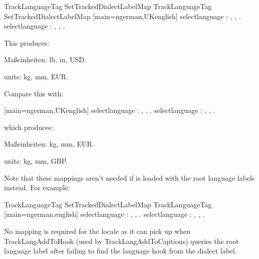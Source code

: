 \documentclass[titlepage=false,oneside,
 fontsize=12pt,captions=tableheading]{scrbook}
\newcommand{\tklcaptions}[1]{\glslink{captionsdialect}{\csfmt{captions#1}}}
\begin{document}
\begin{codebox}[fontupper=\small\ttfamily]
\codepar
{}
\codepar
\gls{TrackLanguageTag}
\gls{SetTrackedDialectLabelMap}
\codepar
\gls{TrackLanguageTag}
\gls{SetTrackedDialectLabelMap}
\codepar
{}[main=ngerman,UKenglish]
\codepar
{}
\gls{selectlanguage}
\codepar
{}: , , .
\codepar
\gls{selectlanguage}
\codepar
{}: , , .
\codepar
{}
\end{codebox}
This produces:
\begin{resultbox}
Ma\ss einheiten: lb, in, USD.

units: kg, mm, EUR.
\end{resultbox}
Compare this with:
\begin{codebox}
\codepar
{}[main=ngerman,UKenglish]
\codepar
{}
\gls{selectlanguage}
\codepar
{}: , , .
\codepar
\gls{selectlanguage}
\codepar
{}: , , .
\codepar
{}
\end{codebox}
which produces:
\begin{resultbox}
Ma\ss einheiten: kg, mm, EUR.

units: kg, mm, GBP.
\end{resultbox}

Note that these mappings aren't needed if 
is loaded with the root language labels instead. For example:
\begin{codebox}[fontupper=\small\ttfamily]
\codepar
{}
\codepar
\gls{TrackLanguageTag}
\gls{SetTrackedDialectLabelMap}
\codepar
\gls{TrackLanguageTag}
\codepar
{}[main=ngerman,english]
\codepar
{}
\gls{selectlanguage}
\codepar
{}: , , .
\codepar
\gls{selectlanguage}
\codepar
{}: , , .
\codepar
{}
\end{codebox}
No mapping is required for the  locale as
it can pick up \tklcaptions{english} when \gls{TrackLangAddToHook}
(used by \gls{TrackLangAddToCaptions})
queries the root language label after failing to find the
language hook from the dialect label.
\end{document}
